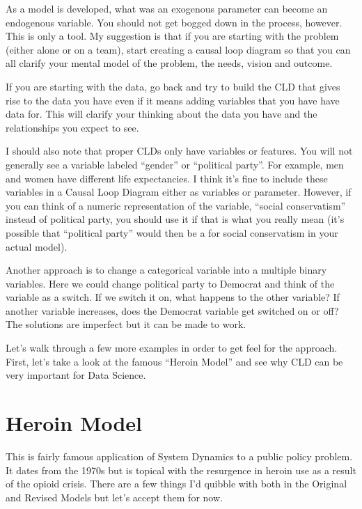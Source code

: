 \documentclass[letterpaper,10pt,english]{sphinxmanual}
\begin{document}
As a model is developed, what was an exogenous parameter can become an endogenous variable. You should not get bogged down in the process, however. This is only a tool. My suggestion is that if you are starting with the problem (either alone or on a team), start creating a causal loop diagram so that you can all clarify your mental model of the problem, the needs, vision and outcome.

If you are starting with the data, go back and try to build the CLD that gives rise to the data you have even if it means adding variables that you  have have data for. This will clarify your thinking about the data you have and the relationships you expect to see.

I should also note that proper CLDs only have  variables or features. You will not generally see a variable labeled “gender” or “political party”. For example, men and women have different life expectancies. I think it’s fine to include these  variables in a Causal Loop Diagram either as variables or parameter. However, if you can think of a numeric representation of the variable, “social conservatism” instead of political party, you should use it if that is what you
really mean (it’s possible that “political party” would then be a  for social conservatism in your actual model).

Another approach is to change a categorical variable into a multiple binary variables. Here we could change political party to Democrat and think of the variable as a switch. If we switch it on, what happens to the other variable? If another variable increases, does the Democrat variable get switched on or off? The solutions are imperfect but it can be made to work.

Let’s walk through a few more examples in order to get feel for the approach. First, let’s take a look at the famous “Heroin Model” and see why CLD can be very important for Data Science.


\section{Heroin Model}
\label{\detokenize{index:Heroin-Model}}
This is fairly famous application of System Dynamics to a public policy problem. It dates from the 1970s but is topical with the resurgence in heroin use as a result of the opioid crisis. There are a few things I’d quibble with both in the Original and Revised Models but let’s accept them for now.
\end{document}
